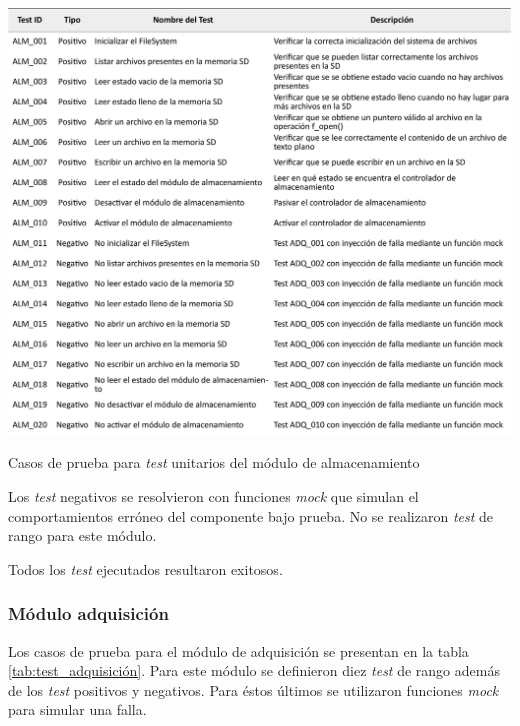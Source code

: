\begin{table}[htpb]
	\centering
	\includegraphics[width=\textwidth]{./Figures/TestSD.pdf}
	\caption{Casos de prueba para \textit{test} unitarios del módulo de almacenamiento}
	\label{tab:test_almacenamiento}
\end{table}

Los \textit{test} negativos se resolvieron con funciones \textit{mock} que simulan el comportamientos erróneo del componente bajo prueba.  No se realizaron \textit{test} de rango para este módulo.

Todos los \textit{test} ejecutados resultaron exitosos.

\subsubsection{Módulo adquisición}

Los casos de prueba para el módulo de adquisición se presentan en la tabla \ref{tab:test_adquisición}. Para este módulo se definieron diez \textit{test} de rango además de los \textit{test} positivos y negativos.  Para éstos últimos se utilizaron funciones \textit{mock} para simular una falla.


